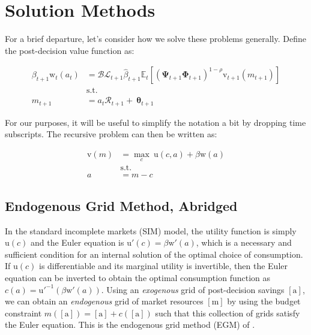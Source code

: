 \documentclass{article}
\newcommand{\DiscFac}{\beta}
\newcommand{\uFunc}{\mathrm{u}}
\newcommand{\vFunc}{\mathrm{v}}
\newcommand{\Alive}{\mathcal{L}}
\newcommand{\Ex}{\mathbb{E}}
\newcommand{\beth}{\mathcal{B}}
\newcommand{\CRRA}{\rho}
\newcommand{\PermGroFac}{\pmb{\Phi}}
\newcommand{\PermShk}{\mathbf{\Psi}}
\newcommand{\aNrm}{a}
\newcommand{\cNrm}{c}
\newcommand{\RNrm}{\mathcal{R}}
\newcommand{\TranShkEmp}{\pmb{\theta}}
\newcommand{\mNrm}{m}
\newcommand{\wFunc}{\mathrm{w}}
\newcommand{\aRat}{a}
\newcommand{\mRat}{m}
\newcommand{\aMat}{[\mathrm{a}]}
\newcommand{\mMat}{[\mathrm{m}]}
\begin{document}
\section{Solution Methods}\label{Solution Methods}

For a brief departure, let's consider how we solve these problems generally. Define the post-decision value function as:

\begin{equation}
\begin{align}
    \DiscFac_{t+1} \wFunc_{t}(\aNrm_{t}) & = \beth\Alive_{t+1}\hat{\DiscFac}_{t+1}
    \Ex_{t}[(\PermShk_{t+1}\PermGroFac_{t+1})^{1-\CRRA}{\vFunc}_{t+1}({m}_{t+1})]
    \\ & \text{s.t.}
    \\ {m}_{t+1} & = \aNrm_{t}\RNrm_{t+1}+ ~\TranShkEmp_{t+1}
\end{align}
\end{equation}

For our purposes, it will be useful to simplify the notation a bit by dropping time subscripts. The recursive problem can then be written as:

\begin{equation}
\begin{align}
    \vFunc(\mRat) & = \max_{\cNrm} ~ \uFunc(\cNrm, \aNrm) + \DiscFac \wFunc(\aRat)
    \\ & \text{s.t.}
    \\ \aNrm & = \mRat-\cNrm
\end{align}
\end{equation}

\subsection{Endogenous Grid Method, Abridged}\label{Endogenous Grid Method, Abridged}

In the standard incomplete markets (SIM) model, the utility function is simply $\uFunc(\cNrm)$ and the Euler equation is $\uFunc'(\cNrm) = \DiscFac \wFunc'(\aNrm)$, which is a necessary and sufficient condition for an internal solution of the optimal choice of consumption. If $\uFunc(\cNrm)$ is differentiable and its marginal utility is invertible, then the Euler equation can be inverted to obtain the optimal consumption function as $\cNrm(\aNrm) = \uFunc'^{ -1}(\DiscFac \wFunc'(\aNrm))$. Using an \textit{exogenous} grid of post-decision savings $\aMat$, we can obtain an \textit{endogenous} grid of market resources $\mMat$ by using the budget constraint $\mNrm(\aMat) = \aMat + \cNrm(\aMat)$ such that this collection of grids satisfy the Euler equation. This is the endogenous grid method (EGM) of \cite{Carroll_2006}.
\end{document}
